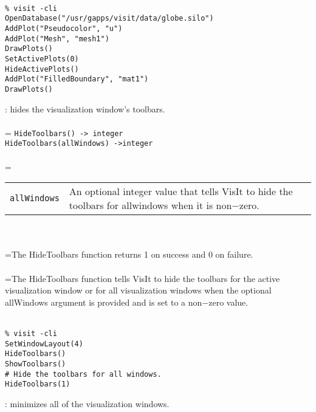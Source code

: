 \documentclass[10pt,a4paper]{report}
\begin{document}
\\[-6mm]
\begin{verbatim}% visit -cli
OpenDatabase("/usr/gapps/visit/data/globe.silo")
AddPlot("Pseudocolor", "u")
AddPlot("Mesh", "mesh1")
DrawPlots()
SetActivePlots(0)
HideActivePlots()
AddPlot("FilledBoundary", "mat1")
DrawPlots()
\end{verbatim}
\newpage


{}
: hides the visualization window's toolbars.\\[-3mm]

 \\ 
\hangindent=\parindent 
\verb!HideToolbars() -> integer!\\ 
\verb!HideToolbars(allWindows) ->integer!\\ [-3mm]

 \\ 
\hangindent=\parindent 
\begin{tabular}{lp{9cm}}
\verb!allWindows! & An optional integer value that tells VisIt to hide the toolbars for allwindows when it is non$-$zero. \\
\end{tabular} \\[-2mm]


 \\ 
\hangindent=\parindent The HideToolbars function returns 1 on success and 0 on failure. \\[-3mm] 

 \\ 
\hangindent=\parindent The HideToolbars function tells VisIt to hide the toolbars for the active visualization window or for all visualization windows when the optional allWindows argument is provided and is set to a non$-$zero value. \\[-3mm] 

\\[-6mm]
\begin{verbatim}% visit -cli
SetWindowLayout(4)
HideToolbars()
ShowToolbars()
# Hide the toolbars for all windows.
HideToolbars(1)
\end{verbatim}
\newpage


{}
: minimizes all of the visualization windows.\\[-3mm]
\end{document}
